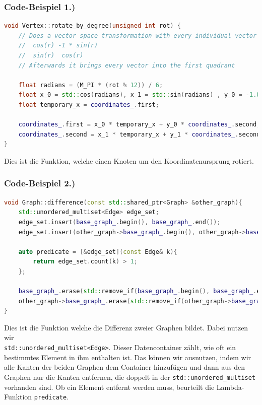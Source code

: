 \documentclass[12pt]{article}
\begin{document}
\subsubsection*{Code-Beispiel 1.)}
\begin{lstlisting}[language=C++]
void Vertex::rotate_by_degree(unsigned int rot) {
    // Does a vector space transformation with every individual vector stored in this matrix
    //  cos(r) -1 * sin(r)
    //  sin(r)  cos(r)
    // Afterwards it brings every vector into the first quadrant

    float radians = (M_PI * (rot % 12)) / 6;
    float x_0 = std::cos(radians), x_1 = std::sin(radians) , y_0 = -1.0 * std::sin(radians), y_1 = std::cos(radians);
    float temporary_x = coordinates_.first;

    coordinates_.first = x_0 * temporary_x + y_0 * coordinates_.second;
    coordinates_.second = x_1 * temporary_x + y_1 * coordinates_.second;
}
\end{lstlisting}

Dies ist die Funktion, welche einen Knoten um den Koordinatenursprung rotiert.

\subsubsection*{Code-Beispiel 2.)}
\begin{lstlisting}[language=C++]
void Graph::difference(const std::shared_ptr<Graph> &other_graph){
    std::unordered_multiset<Edge> edge_set;
    edge_set.insert(base_graph_.begin(), base_graph_.end());
    edge_set.insert(other_graph->base_graph_.begin(), other_graph->base_graph_.end());
    
    auto predicate = [&edge_set](const Edge& k){
        return edge_set.count(k) > 1;
    };

    base_graph_.erase(std::remove_if(base_graph_.begin(), base_graph_.end(), predicate), base_graph_.end());
    other_graph->base_graph_.erase(std::remove_if(other_graph->base_graph_.begin(), other_graph->base_graph_.end(), predicate), other_graph->base_graph_.end());
}
\end{lstlisting}

Dies ist die Funktion welche die Differenz zweier Graphen bildet. Dabei nutzen wir\\ \verb|std::unordered_multiset<Edge>|. Dieser Datencontainer zählt, wie oft ein bestimmtes Element in ihm enthalten ist. Das können wir ausnutzen, indem wir alle Kanten der beiden Graphen dem Container hinzufügen und dann aus den Graphen nur die Kanten entfernen, die doppelt in der \verb|std::unordered_multiset| vorhanden sind. Ob ein Element entfernt werden muss, beurteilt die Lambda-Funktion \verb|predicate|.
\end{document}
